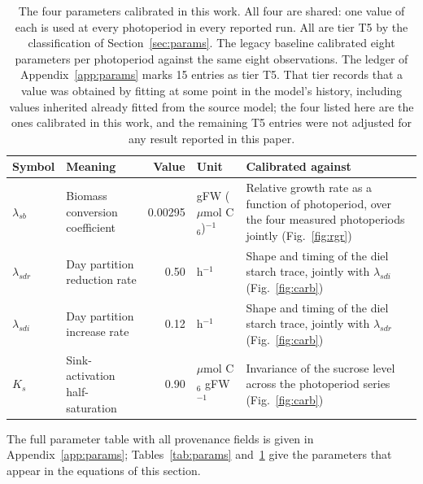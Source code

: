 \begin{table}[!htbp]
\centering
\small
\caption{The four parameters calibrated in this work. All four are shared: one
value of each is used at every photoperiod in every reported run. All are tier T5
by the classification of Section~\ref{sec:params}. The legacy baseline
calibrated eight parameters per photoperiod against the same eight observations.
The ledger of Appendix~\ref{app:params} marks 15 entries as tier T5. That tier
records that a value was obtained by fitting at some point in the model's
history, including values inherited already fitted from the source model; the
four listed here are the ones calibrated in this work, and the remaining T5
entries were not adjusted for any result reported in this paper.}
\label{tab:fitted}
\begin{tabular}{@{}llrlp{38mm}@{}}
\toprule
Symbol & Meaning & Value & Unit & Calibrated against \\
\midrule
$\lambda_{sb}$ & Biomass conversion coefficient & 0.00295 & gFW ($\mu$mol C$_6$)$^{-1}$ & Relative growth rate as a function of photoperiod, over the four measured photoperiods jointly (Fig.~\ref{fig:rgr}) \\[2pt]
$\lambda_{sdr}$ & Day partition reduction rate & 0.50 & h$^{-1}$ & Shape and timing of the diel starch trace, jointly with $\lambda_{sdi}$ (Fig.~\ref{fig:carb}) \\[2pt]
$\lambda_{sdi}$ & Day partition increase rate & 0.12 & h$^{-1}$ & Shape and timing of the diel starch trace, jointly with $\lambda_{sdr}$ (Fig.~\ref{fig:carb}) \\[2pt]
$K_s$ & Sink-activation half-saturation & 0.90 & $\mu$mol C$_6$ gFW$^{-1}$ & Invariance of the sucrose level across the photoperiod series (Fig.~\ref{fig:carb}) \\[2pt]
\bottomrule
\end{tabular}
\end{table}

The full parameter table with all provenance fields is given in
Appendix~\ref{app:params}; Tables~\ref{tab:params} and~\ref{tab:fitted} give the
parameters that appear in the equations of this section.
